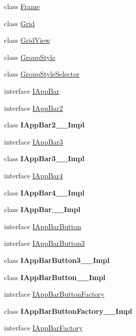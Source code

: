 \begin{DoxyCompactItemize}
class \hyperlink{class_windows_1_1_u_i_1_1_xaml_1_1_controls_1_1_frame}{Frame}
\item 
class \hyperlink{class_windows_1_1_u_i_1_1_xaml_1_1_controls_1_1_grid}{Grid}
\item 
class \hyperlink{class_windows_1_1_u_i_1_1_xaml_1_1_controls_1_1_grid_view}{Grid\+View}
\item 
class \hyperlink{class_windows_1_1_u_i_1_1_xaml_1_1_controls_1_1_group_style}{Group\+Style}
\item 
class \hyperlink{class_windows_1_1_u_i_1_1_xaml_1_1_controls_1_1_group_style_selector}{Group\+Style\+Selector}
\item 
interface \hyperlink{interface_windows_1_1_u_i_1_1_xaml_1_1_controls_1_1_i_app_bar}{I\+App\+Bar}
\item 
interface \hyperlink{interface_windows_1_1_u_i_1_1_xaml_1_1_controls_1_1_i_app_bar2}{I\+App\+Bar2}
\item 
class {\bfseries I\+App\+Bar2\+\_\+\+\_\+\+Impl}
\item 
interface \hyperlink{interface_windows_1_1_u_i_1_1_xaml_1_1_controls_1_1_i_app_bar3}{I\+App\+Bar3}
\item 
class {\bfseries I\+App\+Bar3\+\_\+\+\_\+\+Impl}
\item 
interface \hyperlink{interface_windows_1_1_u_i_1_1_xaml_1_1_controls_1_1_i_app_bar4}{I\+App\+Bar4}
\item 
class {\bfseries I\+App\+Bar4\+\_\+\+\_\+\+Impl}
\item 
class {\bfseries I\+App\+Bar\+\_\+\+\_\+\+Impl}
\item 
interface \hyperlink{interface_windows_1_1_u_i_1_1_xaml_1_1_controls_1_1_i_app_bar_button}{I\+App\+Bar\+Button}
\item 
interface \hyperlink{interface_windows_1_1_u_i_1_1_xaml_1_1_controls_1_1_i_app_bar_button3}{I\+App\+Bar\+Button3}
\item 
class {\bfseries I\+App\+Bar\+Button3\+\_\+\+\_\+\+Impl}
\item 
class {\bfseries I\+App\+Bar\+Button\+\_\+\+\_\+\+Impl}
\item 
interface \hyperlink{interface_windows_1_1_u_i_1_1_xaml_1_1_controls_1_1_i_app_bar_button_factory}{I\+App\+Bar\+Button\+Factory}
\item 
class {\bfseries I\+App\+Bar\+Button\+Factory\+\_\+\+\_\+\+Impl}
\item 
interface \hyperlink{interface_windows_1_1_u_i_1_1_xaml_1_1_controls_1_1_i_app_bar_factory}{I\+App\+Bar\+Factory}
\item 

\end{DoxyCompactItemize}

